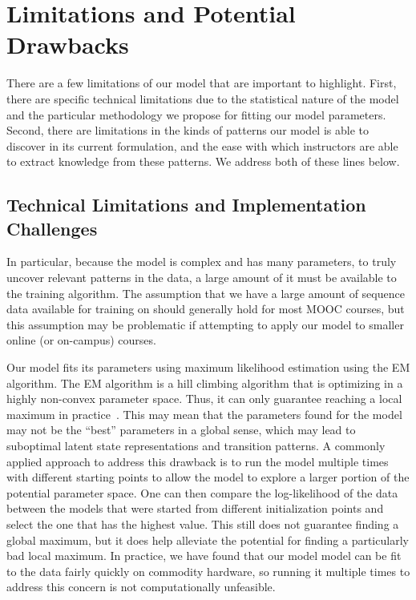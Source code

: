 \section{Limitations and Potential Drawbacks}

There are a few limitations of our model that are important to highlight.
First, there are specific technical limitations due to the statistical
nature of the model and the particular methodology we propose for fitting
our model parameters. Second, there are limitations in the kinds of
patterns our model is able to discover in its current formulation, and the
ease with which instructors are able to extract knowledge from these
patterns. We address both of these lines below.

\subsection{Technical Limitations and Implementation Challenges}
In particular, because the model is complex and has many parameters,
to truly uncover relevant patterns in the data, a large amount of it must
be available to the training algorithm. The assumption that we have a large
amount of sequence data available for training on should generally hold for
most MOOC courses, but this assumption may be problematic if attempting to
apply our model to smaller online (or on-campus) courses.

Our model fits its parameters using maximum likelihood estimation using the
EM algorithm. The EM algorithm is a hill climbing algorithm that is
optimizing in a highly non-convex parameter space. Thus, it can only
guarantee reaching a local maximum in practice~\citep{Dempster:1977:JRSS}.
This may mean that the parameters found for the model may not be the
``best'' parameters in a global sense, which may lead to suboptimal latent
state representations and transition patterns. A commonly applied approach
to address this drawback is to run the model multiple times with different
starting points to allow the model to explore a larger portion of the
potential parameter space. One can then compare the log-likelihood of the
data between the models that were started from different initialization
points and select the one that has the highest value. This still does not
guarantee finding a global maximum, but it does help alleviate the
potential for finding a particularly bad local maximum. In practice, we
have found that our model model can be fit to the data fairly quickly on
commodity hardware, so running it multiple times to address this concern is
not computationally unfeasible.

